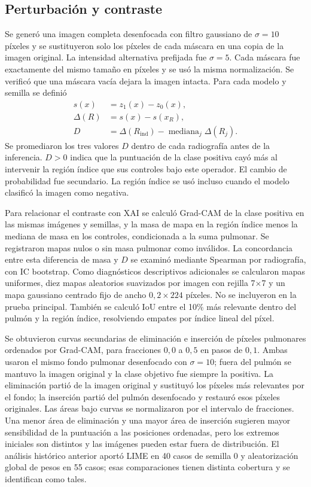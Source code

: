 \documentclass[conference]{IEEEtran}
\begin{document}
\subsection{Perturbación y contraste}
Se generó una imagen completa desenfocada con filtro gaussiano de $\sigma=10$ píxeles y se sustituyeron solo los píxeles de cada máscara en una copia de la imagen original. La intensidad alternativa prefijada fue $\sigma=5$. Cada máscara fue exactamente del mismo tamaño en píxeles y se usó la misma normalización. Se verificó que una máscara vacía dejara la imagen intacta. Para cada modelo y semilla se definió
\begin{equation}
\begin{aligned}
s(x)&=z_1(x)-z_0(x),\\
\Delta(R)&=s(x)-s(x_R),\\
D&=\Delta(R_{\mathrm{ind}})-\operatorname{mediana}_j\Delta(R_j).
\end{aligned}
\end{equation}
Se promediaron los tres valores $D$ dentro de cada radiografía antes de la inferencia. $D>0$ indica que la puntuación de la clase positiva cayó más al intervenir la región índice que sus controles bajo este operador. El cambio de probabilidad fue secundario. La región índice se usó incluso cuando el modelo clasificó la imagen como negativa.

Para relacionar el contraste con XAI se calculó Grad-CAM de la clase positiva en las mismas imágenes y semillas, y la masa de mapa en la región índice menos la mediana de masa en los controles, condicionada a la suma pulmonar. Se registraron mapas nulos o sin masa pulmonar como inválidos. La concordancia entre esta diferencia de masa y $D$ se examinó mediante Spearman por radiografía, con IC bootstrap. Como diagnósticos descriptivos adicionales se calcularon mapas uniformes, diez mapas aleatorios suavizados por imagen con rejilla 7$\times$7 y un mapa gaussiano centrado fijo de ancho $0,2\times224$ píxeles. No se incluyeron en la prueba principal. También se calculó IoU entre el 10\% más relevante dentro del pulmón y la región índice, resolviendo empates por índice lineal del píxel.

Se obtuvieron curvas secundarias de eliminación e inserción de píxeles pulmonares ordenados por Grad-CAM, para fracciones $0,0$ a $0,5$ en pasos de $0,1$. Ambas usaron el mismo fondo pulmonar desenfocado con $\sigma=10$; fuera del pulmón se mantuvo la imagen original y la clase objetivo fue siempre la positiva. La eliminación partió de la imagen original y sustituyó los píxeles más relevantes por el fondo; la inserción partió del pulmón desenfocado y restauró esos píxeles originales. Las áreas bajo curvas se normalizaron por el intervalo de fracciones. Una menor área de eliminación y una mayor área de inserción sugieren mayor sensibilidad de la puntuación a las posiciones ordenadas, pero los extremos iniciales son distintos y las imágenes pueden estar fuera de distribución. El análisis histórico anterior aportó LIME en 40 casos de semilla 0 y aleatorización global de pesos en 55 casos; esas comparaciones tienen distinta cobertura y se identifican como tales.
\end{document}
